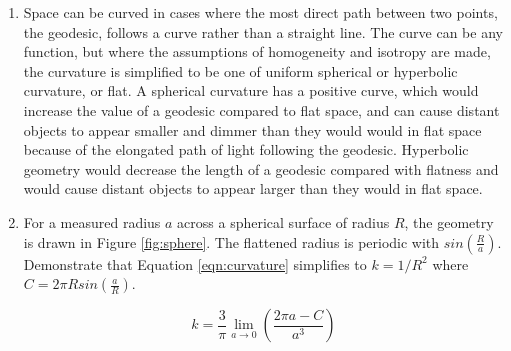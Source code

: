 \documentclass{paper}
\begin{document}
\begin{enumerate}
    \item %
      Space can be curved in cases where the most direct path between two
      points, the geodesic, follows a curve rather than a straight line. The
      curve can be any function, but where the assumptions of homogeneity and
      isotropy are made, the curvature is simplified to be one of uniform
      spherical or hyperbolic curvature, or flat. A spherical curvature has
      a positive curve, which would increase the value of a geodesic compared
      to flat space, and can cause distant objects to appear smaller and 
      dimmer than they would would in flat space because of the elongated path 
      of light following the geodesic. Hyperbolic geometry would decrease the 
      length of a geodesic compared with flatness and would cause distant
      objects to appear larger than they would in flat space.

   \item %
     For a measured radius \(a\) across a spherical surface of radius \(R\),
     the geometry is drawn in Figure \ref{fig:sphere}. The flattened radius
     is periodic with \(sin \left(\frac{R}{a}\right)\). Demonstrate that
     Equation \ref{eqn:curvature} simplifies to \(k = 1/R^2\) where 
     \(C=2 \pi R sin \left(\frac{a}{R}\right)\).

     \begin{equation}
       k = \frac{3}{\pi} \lim_{a \to 0} \left( \frac{2 \pi a - C}{a^3} \right)
       \label{eqn:curvature}
     \end{equation}

     \begin{figure}
        \begin{center}
        \end{center}


\end{figure}
\end{enumerate}
\end{document}
